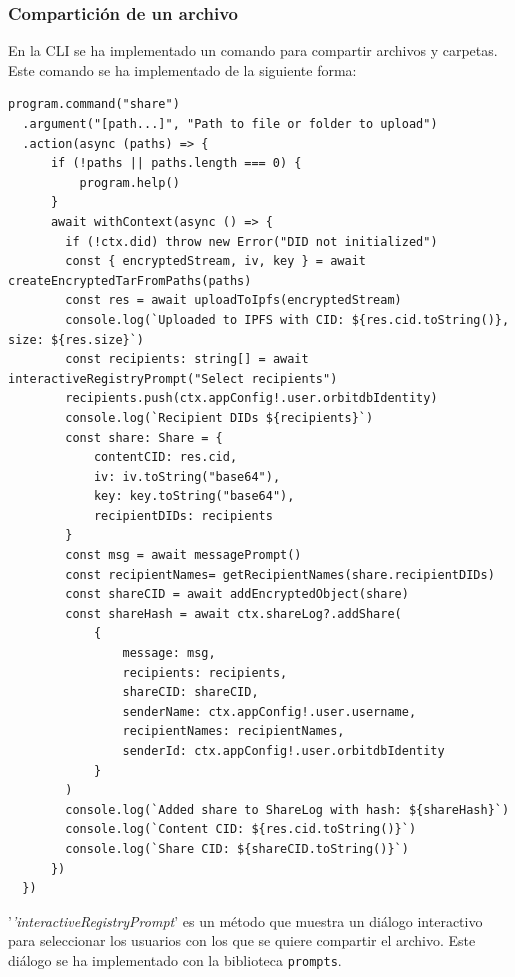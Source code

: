 \subsubsection{Compartición de un archivo}
En la CLI se ha implementado un comando para compartir archivos y carpetas. Este comando se ha implementado de la siguiente forma:
\begin{verbatim}
program.command("share")
  .argument("[path...]", "Path to file or folder to upload")
  .action(async (paths) => {
      if (!paths || paths.length === 0) {
          program.help()
      }
      await withContext(async () => {
        if (!ctx.did) throw new Error("DID not initialized")
        const { encryptedStream, iv, key } = await createEncryptedTarFromPaths(paths)
        const res = await uploadToIpfs(encryptedStream)
        console.log(`Uploaded to IPFS with CID: ${res.cid.toString()}, size: ${res.size}`)
        const recipients: string[] = await interactiveRegistryPrompt("Select recipients")
        recipients.push(ctx.appConfig!.user.orbitdbIdentity)
        console.log(`Recipient DIDs ${recipients}`)
        const share: Share = {
            contentCID: res.cid, 
            iv: iv.toString("base64"), 
            key: key.toString("base64"), 
            recipientDIDs: recipients
        }
        const msg = await messagePrompt()
        const recipientNames= getRecipientNames(share.recipientDIDs)
        const shareCID = await addEncryptedObject(share)
        const shareHash = await ctx.shareLog?.addShare(
            {
                message: msg,
                recipients: recipients,
                shareCID: shareCID,
                senderName: ctx.appConfig!.user.username,
                recipientNames: recipientNames, 
                senderId: ctx.appConfig!.user.orbitdbIdentity
            }
        ) 
        console.log(`Added share to ShareLog with hash: ${shareHash}`)
        console.log(`Content CID: ${res.cid.toString()}`)
        console.log(`Share CID: ${shareCID.toString()}`)
      })
  })
\end{verbatim}

'\textit{'interactiveRegistryPrompt}' es un método que muestra un diálogo interactivo para seleccionar los usuarios con los que se quiere compartir el archivo. Este diálogo se ha implementado con la biblioteca \texttt{prompts}.


